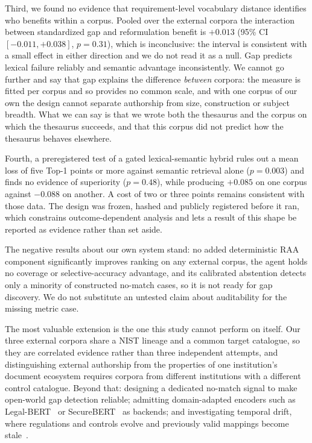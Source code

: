 \documentclass[smallextended,natbib]{svjour3}
\begin{document}
Third, we found no evidence that requirement-level vocabulary distance identifies who benefits within a corpus. Pooled over the external corpora the interaction between standardized gap and reformulation benefit is $+0.013$ (95\% CI $[-0.011, +0.038]$, $p = 0.31$), which is inconclusive: the interval is consistent with a small effect in either direction and we do not read it as a null. Gap predicts lexical failure reliably and semantic advantage inconsistently. We cannot go further and say that gap explains the difference \emph{between} corpora: the measure is fitted per corpus and so provides no common scale, and with one corpus of our own the design cannot separate authorship from size, construction or subject breadth. What we can say is that we wrote both the thesaurus and the corpus on which the thesaurus succeeds, and that this corpus did not predict how the thesaurus behaves elsewhere.

Fourth, a preregistered test of a gated lexical-semantic hybrid rules out a mean loss of five Top-1 points or more against semantic retrieval alone ($p = 0.003$) and finds no evidence of superiority ($p = 0.48$), while producing $+0.085$ on one corpus against $-0.088$ on another. A cost of two or three points remains consistent with those data. The design was frozen, hashed and publicly registered before it ran, which constrains outcome-dependent analysis and lets a result of this shape be reported as evidence rather than set aside.

The negative results about our own system stand: no added deterministic RAA component significantly improves ranking on any external corpus, the agent holds no coverage or selective-accuracy advantage, and its calibrated abstention detects only a minority of constructed no-match cases, so it is not ready for gap discovery. We do not substitute an untested claim about auditability for the missing metric case.

The most valuable extension is the one this study cannot perform on itself. Our three external corpora share a NIST lineage and a common target catalogue, so they are correlated evidence rather than three independent attempts, and distinguishing external authorship from the properties of one institution's document ecosystem requires corpora from different institutions with a different control catalogue. Beyond that: designing a dedicated no-match signal to make open-world gap detection reliable; admitting domain-adapted encoders such as Legal-BERT~\citep{Chalkidis2020} or SecureBERT~\citep{Aghaei2022} as backends; and investigating temporal drift, where regulations and controls evolve and previously valid mappings become stale~\citep{Gama2014}.
\end{document}
